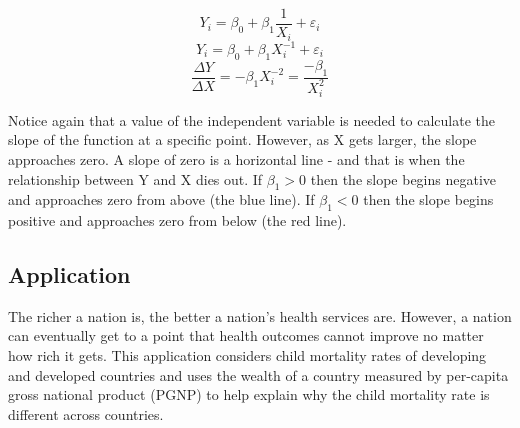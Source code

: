 \documentclass[
]{book}
\newenvironment{Shaded}{\begin{snugshade}}{\end{snugshade}}
\newcommand{\DecValTok}[1]{\textcolor[rgb]{0.00,0.00,0.81}{#1}}
\newcommand{\FunctionTok}[1]{\textcolor[rgb]{0.13,0.29,0.53}{\textbf{#1}}}
\newcommand{\NormalTok}[1]{#1}
\newcommand{\OtherTok}[1]{\textcolor[rgb]{0.56,0.35,0.01}{#1}}
\newcommand{\SpecialCharTok}[1]{\textcolor[rgb]{0.81,0.36,0.00}{\textbf{#1}}}
\newcommand{\StringTok}[1]{\textcolor[rgb]{0.31,0.60,0.02}{#1}}
\begin{document}
\[Y_i = \beta_0 + \beta_1 \frac{1}{X_i} + \varepsilon_i\]
\[Y_i = \beta_0 + \beta_1 X_i^{-1} + \varepsilon_i\]
\[\frac{\Delta Y}{\Delta X} = -\beta_1 X_i^{-2}=\frac{-\beta_1} {X_i^{2}}\]

Notice again that a value of the independent variable is needed to calculate the slope of the function at a specific point. However, as X gets larger, the slope approaches zero. A slope of zero is a horizontal line - and that is when the relationship between Y and X dies out. If \(\beta_1>0\) then the slope begins negative and approaches zero from above (the blue line). If \(\beta_1<0\) then the slope begins positive and approaches zero from below (the red line).

\subsection*{Application}\label{application-6}

The richer a nation is, the better a nation's health services are. However, a nation can eventually get to a point that health outcomes cannot improve no matter how rich it gets. This application considers child mortality rates of developing and developed countries and uses the wealth of a country measured by per-capita gross national product (PGNP) to help explain why the child mortality rate is different across countries.

\begin{Shaded}
\end{Shaded}
\end{document}
